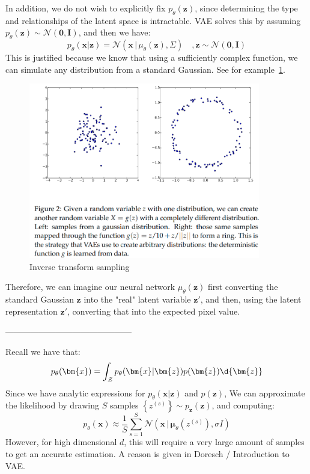 \documentclass{article}
\begin{document}
In addition, we do not wish to explicitly fix $p_{\theta}(\bm{z})$, since determining the type and relationships of the latent space is intractable. VAE solves this by assuming $p_{\theta}(\bm{z}) \sim  \mathcal{N}(\bm{0}, \bm{I})$, and then we have:
\[
  p_{\theta}(\bm{x} | \bm{z}) = \mathcal{N}(\bm{x} \, | \,  \mu_{\theta}(\bm{z}), \Sigma) \quad, \bm{z} \sim  \mathcal{N}(\bm{0}, \bm{I})
\] 
This is justified because we know that using a sufficiently complex function, we can simulate any distribution from a standard Gaussian. See for example~\cref{fig:inverseTransformSampling}. 
\begin{figure}[H] \centering \includegraphics[height=0.3\textheight,width=0.9\textwidth,keepaspectratio]{inverseTransformSampling} \caption{Inverse transform sampling} \label{fig:inverseTransformSampling}  \end{figure}
Therefore, we can imagine our neural network $\mu_{\theta}(\bm{z})$ first converting the standard Gaussian $\bm{z}$ into the "real" latent variable $\bm{z}'$, and then, using the latent representation $\bm{z}'$, converting that into the expected pixel value. 

---------------------------------------------

Recall we have that:
\[
  p_{\theta}(\bm{x}) = \int_{\mathcal{Z}} p_{\theta}(\bm{x} | \bm{z}) p(\bm{z}) \d{\bm{z}}
\]
Since we have analytic expressions for $p_{\theta}(\bm{x} | \bm{z})$ and $p(\bm{z})$, 
We can approximate the likelihood by drawing $S$ samples $\left\{ z^{(s)} \right\} \sim p_{\bm{z}}(\bm{z})$, and computing:
\[
  p_{\theta}(\bm{x}) \approx \frac{1}{S} \sum_{s=1}^{S} \mathcal{N}( \bm{x} \, | \,  \bm{\mu}_{\theta}(z^{(s)}), \sigma I)
\]
However, for high dimensional $d$, this will require a very large amount of samples to get an accurate estimation. A reason is given in Doresch / Introduction to VAE. 
\end{document}
